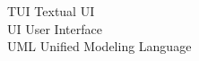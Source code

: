 \begin{tabbing}




    \>TUI \>\>Textual UI\\






    \>UI \>\>User Interface\\





    \>UML \>\>Unified Modeling Language\\








\end{tabbing}
